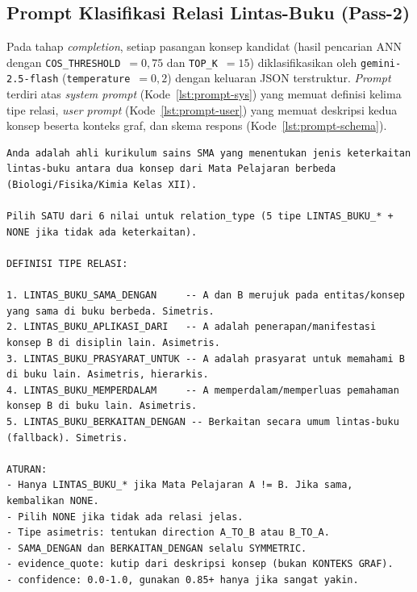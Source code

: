 \documentclass[../../thesis]{subfiles}
\begin{document}
\subsection{Prompt Klasifikasi Relasi Lintas-Buku (Pass-2)}
\label{lamp:prompt-completion}

Pada tahap \textit{completion}, setiap pasangan konsep kandidat (hasil pencarian
ANN dengan \texttt{COS\_THRESHOLD}~$=0{,}75$ dan \texttt{TOP\_K}~$=15$)
diklasifikasikan oleh \texttt{gemini-2.5-flash} (\texttt{temperature}~$=0{,}2$)
dengan keluaran JSON terstruktur. \textit{Prompt} terdiri atas \textit{system
prompt} (Kode~\ref{lst:prompt-sys}) yang memuat definisi kelima tipe relasi,
\textit{user prompt} (Kode~\ref{lst:prompt-user}) yang memuat deskripsi kedua
konsep beserta konteks graf, dan skema respons (Kode~\ref{lst:prompt-schema}).

\begin{lstlisting}[style=promptbox,caption={System prompt klasifikasi relasi (Pass-2). Blok \texttt{DEFINISI TIPE RELASI} disisipkan dari konstanta \texttt{TYPE\_DEFINITIONS}.},label={lst:prompt-sys}]
Anda adalah ahli kurikulum sains SMA yang menentukan jenis keterkaitan
lintas-buku antara dua konsep dari Mata Pelajaran berbeda (Biologi/Fisika/Kimia Kelas XII).

Pilih SATU dari 6 nilai untuk relation_type (5 tipe LINTAS_BUKU_* + NONE jika tidak ada keterkaitan).

DEFINISI TIPE RELASI:

1. LINTAS_BUKU_SAMA_DENGAN     -- A dan B merujuk pada entitas/konsep yang sama di buku berbeda. Simetris.
2. LINTAS_BUKU_APLIKASI_DARI   -- A adalah penerapan/manifestasi konsep B di disiplin lain. Asimetris.
3. LINTAS_BUKU_PRASYARAT_UNTUK -- A adalah prasyarat untuk memahami B di buku lain. Asimetris, hierarkis.
4. LINTAS_BUKU_MEMPERDALAM     -- A memperdalam/memperluas pemahaman konsep B di buku lain. Asimetris.
5. LINTAS_BUKU_BERKAITAN_DENGAN -- Berkaitan secara umum lintas-buku (fallback). Simetris.

ATURAN:
- Hanya LINTAS_BUKU_* jika Mata Pelajaran A != B. Jika sama, kembalikan NONE.
- Pilih NONE jika tidak ada relasi jelas.
- Tipe asimetris: tentukan direction A_TO_B atau B_TO_A.
- SAMA_DENGAN dan BERKAITAN_DENGAN selalu SYMMETRIC.
- evidence_quote: kutip dari deskripsi konsep (bukan KONTEKS GRAF).
- confidence: 0.0-1.0, gunakan 0.85+ hanya jika sangat yakin.
\end{lstlisting}
\end{document}
